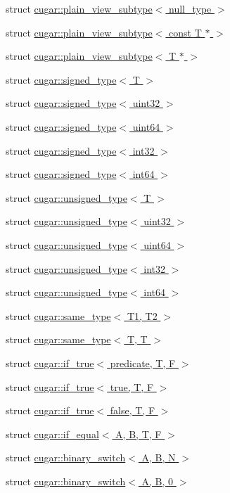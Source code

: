 \begin{DoxyCompactItemize}
\item 
struct \hyperlink{structcugar_1_1plain__view__subtype_3_01null__type_01_4}{cugar\+::plain\+\_\+view\+\_\+subtype$<$ null\+\_\+type $>$}
\item 
struct \hyperlink{structcugar_1_1plain__view__subtype_3_01const_01_t_01_5_01_4}{cugar\+::plain\+\_\+view\+\_\+subtype$<$ const T $\ast$ $>$}
\item 
struct \hyperlink{structcugar_1_1plain__view__subtype_3_01_t_01_5_01_4}{cugar\+::plain\+\_\+view\+\_\+subtype$<$ T $\ast$ $>$}
\item 
struct \hyperlink{structcugar_1_1signed__type}{cugar\+::signed\+\_\+type$<$ T $>$}
\item 
struct \hyperlink{structcugar_1_1signed__type_3_01uint32_01_4}{cugar\+::signed\+\_\+type$<$ uint32 $>$}
\item 
struct \hyperlink{structcugar_1_1signed__type_3_01uint64_01_4}{cugar\+::signed\+\_\+type$<$ uint64 $>$}
\item 
struct \hyperlink{structcugar_1_1signed__type_3_01int32_01_4}{cugar\+::signed\+\_\+type$<$ int32 $>$}
\item 
struct \hyperlink{structcugar_1_1signed__type_3_01int64_01_4}{cugar\+::signed\+\_\+type$<$ int64 $>$}
\item 
struct \hyperlink{structcugar_1_1unsigned__type}{cugar\+::unsigned\+\_\+type$<$ T $>$}
\item 
struct \hyperlink{structcugar_1_1unsigned__type_3_01uint32_01_4}{cugar\+::unsigned\+\_\+type$<$ uint32 $>$}
\item 
struct \hyperlink{structcugar_1_1unsigned__type_3_01uint64_01_4}{cugar\+::unsigned\+\_\+type$<$ uint64 $>$}
\item 
struct \hyperlink{structcugar_1_1unsigned__type_3_01int32_01_4}{cugar\+::unsigned\+\_\+type$<$ int32 $>$}
\item 
struct \hyperlink{structcugar_1_1unsigned__type_3_01int64_01_4}{cugar\+::unsigned\+\_\+type$<$ int64 $>$}
\item 
struct \hyperlink{structcugar_1_1same__type}{cugar\+::same\+\_\+type$<$ T1, T2 $>$}
\item 
struct \hyperlink{structcugar_1_1same__type_3_01_t_00_01_t_01_4}{cugar\+::same\+\_\+type$<$ T, T $>$}
\item 
struct \hyperlink{structcugar_1_1if__true}{cugar\+::if\+\_\+true$<$ predicate, T, F $>$}
\item 
struct \hyperlink{structcugar_1_1if__true_3_01true_00_01_t_00_01_f_01_4}{cugar\+::if\+\_\+true$<$ true, T, F $>$}
\item 
struct \hyperlink{structcugar_1_1if__true_3_01false_00_01_t_00_01_f_01_4}{cugar\+::if\+\_\+true$<$ false, T, F $>$}
\item 
struct \hyperlink{structcugar_1_1if__equal}{cugar\+::if\+\_\+equal$<$ A, B, T, F $>$}
\item 
struct \hyperlink{structcugar_1_1binary__switch}{cugar\+::binary\+\_\+switch$<$ A, B, N $>$}
\item 
struct \hyperlink{structcugar_1_1binary__switch_3_01_a_00_01_b_00_010_01_4}{cugar\+::binary\+\_\+switch$<$ A, B, 0 $>$}
\end{DoxyCompactItemize}
